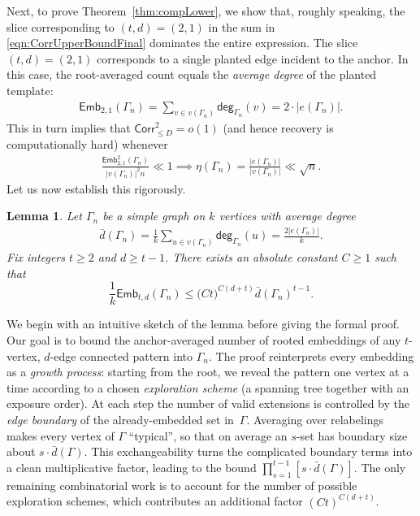 \documentclass[12pt]{article}
\newtheorem{lemma}{Lemma}
\newcommand{\s}[1]{\mathsf{#1}}
\begin{document}
Next, to prove Theorem~\ref{thm:compLower}, we show that, roughly speaking, the slice corresponding to $(t,d) = (2,1)$ in the sum in \eqref{eqn:CorrUpperBoundFinal} dominates the entire expression. The slice $(t,d) = (2,1)$ corresponds to a single planted edge incident to the anchor. In this case, the root-averaged count equals the \emph{average degree} of the planted template:
\begin{align}
\s{Emb}_{2,1}(\Gamma_n)
=\sum_{v\in v(\Gamma_n)} \s{deg}_{\Gamma_n}(v)=2\cdot|e(\Gamma_n)|.
\end{align}
This in turn implies that $\s{Corr}^2_{\le D} = o(1)$ (and hence recovery is computationally hard) whenever
\begin{align}
    \frac{\s{Emb}^2_{2,1}(\Gamma_n)}{|v(\Gamma_n)|^2n}\ll1\implies\eta(\Gamma_n)=\frac{|e(\Gamma_n)|}{|v(\Gamma_n)|}\ll\sqrt{n}.
\end{align}
Let us now establish this rigorously.

\begin{lemma}\label{lem:anchor-avg-emb}
Let $\Gamma_n$ be a simple graph on $k$ vertices with average degree
\begin{align}
\bar{d}(\Gamma_n)=\frac{1}{k}\sum_{u\in v(\Gamma_n)}\s{deg}_{\Gamma_n}(u)=\frac{2|e(\Gamma_n)|}{k}.
\end{align}
Fix integers $t\ge 2$ and $d\ge t-1$. There exists an absolute constant $C\ge 1$ such that
\begin{equation}\label{eq:anchor-avg-emb}
\frac{1}{k}  \s{Emb}_{t,d}(\Gamma_n)
\leq 
\big(Ct\big)^{  C(d+t)}  \bar{d}(\Gamma_n)^{  t-1}.
\end{equation}
\end{lemma}

We begin with an intuitive sketch of the lemma before giving the formal proof. 
Our goal is to bound the anchor-averaged number of rooted embeddings of any $t$-vertex, $d$-edge connected pattern into $\Gamma_n$. The proof reinterprets every embedding as a \emph{growth process}: starting from the root, we reveal the pattern one vertex at a time according to a chosen 
\emph{exploration scheme} (a spanning tree together with an exposure order). At each step the number of valid extensions is controlled by the \emph{edge boundary} of the already-embedded set in~$\Gamma$. Averaging over relabelings makes every vertex of $\Gamma$ ``typical'', so that 
on average an $s$-set has boundary size about $s\cdot\bar{d}(\Gamma)$. This exchangeability turns the complicated boundary terms into a clean  multiplicative factor, leading to the bound
$\prod_{s=1}^{t-1} [s\cdot\bar{d}(\Gamma)]$. The only remaining combinatorial work is to account for the number of possible exploration schemes, which contributes an additional factor $(Ct)^{C(d+t)}$. 
\end{document}
